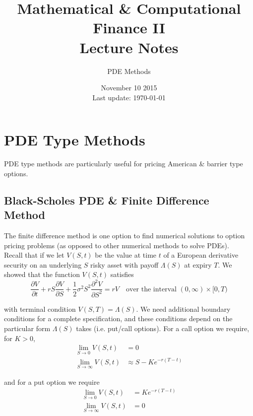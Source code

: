 \documentclass[12pt]{article}
\newlength\tindent
\renewcommand{\indent}{\hspace*{\tindent}}
\begin{document}
 
 
\title{Mathematical \& Computational Finance II\\Lecture Notes}
\author{PDE Methods}
\date{November 10 2015 \\ Last update: \today{}}
\maketitle

\section{PDE Type Methods}

PDE type methods are particularly useful for pricing American \& barrier type options.

\subsection{Black-Scholes PDE \& Finite Difference Method}

\indent The finite difference method is one option to find numerical solutions to option pricing problems (as opposed to other numerical methods to solve PDEs). \\

\indent Recall that if we let $V(S, t)$ be the value at time $t$ of a European derivative security on an underlying $S$ risky asset with payoff $\Lambda(S)$ at expiry $T$. We showed that the function $V(S, t)$ satisfies
\begin{equation*}
	\frac{\partial V}{\partial t} + rS\frac{\partial V}{\partial S} + \frac{1}{2}\sigma^2 S^2 \frac{\partial^2 V}{\partial S^2} = rV \quad \text{over the interval } (0, \infty)\times[0, T)
\end{equation*}

with terminal condition $V(S, T) = \Lambda(S)$. We need additional boundary conditions for a complete specification, and these conditions depend on the particular form $\Lambda(S)$ takes (i.e. put/call options). For a call option we require, for $K > 0$,
\begin{align*}
	\lim_{S\to 0} V(S,t) &= 0 \\
	\lim_{S\to\infty} V(S,t) &\approx S - Ke^{-r(T - t)}
\end{align*}

and for a put option we require
\begin{align*}
	\lim_{S\to 0} V(S, t) &= Ke^{-r(T - t)} \\
	\lim_{S\to\infty} V(S, t) &= 0
\end{align*}
\end{document}
